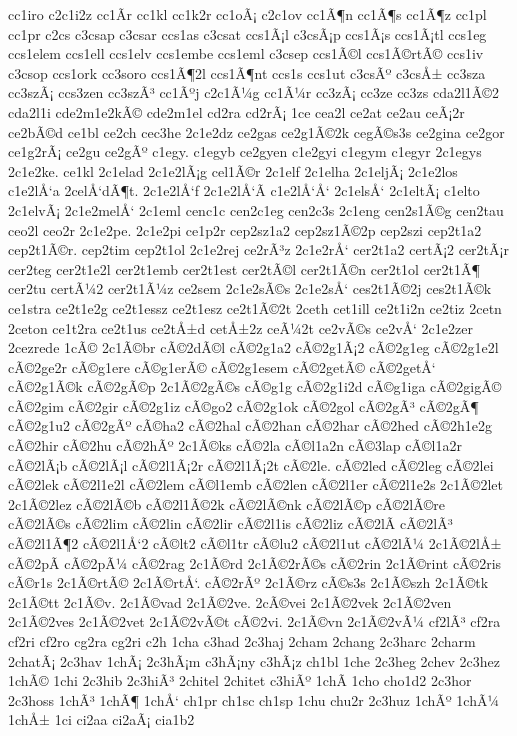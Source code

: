 {cc1iro
c2c1i2z
cc1Ã­r
cc1kl
cc1k2r
cc1oÃ¡
c2c1ov
cc1Ã¶n
cc1Ã¶s
cc1Ã¶z
cc1pl
cc1pr
c2cs
c3csap
c3csar
ccs1as
c3csat
ccs1Ã¡l
c3csÃ¡p
ccs1Ã¡s
ccs1Ã¡tl
ccs1eg
ccs1elem
ccs1ell
ccs1elv
ccs1embe
ccs1eml
c3csep
ccs1Ã©l
ccs1Ã©rtÃ©
ccs1iv
c3csop
ccs1ork
cc3soro
ccs1Ã¶2l
ccs1Ã¶nt
ccs1s
ccs1ut
c3csÃº
c3csÅ±
cc3sza
cc3szÃ¡
ccs3zen
cc3szÃ³
cc1Ãºj
c2c1Ã¼g
cc1Ã¼r
cc3zÃ¡
cc3ze
cc3zs
cda2l1Ã©2
cda2l1i
cde2m1e2kÃ©
cde2m1el
cd2ra
cd2rÃ¡
1ce
cea2l
ce2at
ce2au
ceÃ¡2r
ce2bÃ©d
ce1bl
ce2ch
cec3he
2c1e2dz
ce2gas
ce2g1Ã©2k
cegÃ©s3s
ce2gina
ce2gor
ce1g2rÃ¡
ce2gu
ce2gÃº
c1egy.
c1egyb
ce2gyen
c1e2gyi
c1egym
c1egyr
2c1egys
2c1e2ke.
ce1kl
2c1elad
2c1e2lÃ¡g
cel1Ã©r
2c1elf
2c1elha
2c1eljÃ¡
2c1e2los
c1e2lÅ‘a
2celÅ‘dÃ¶t.
2c1e2lÅ‘f
2c1e2lÅ‘Ã­
c1e2lÅ‘Å‘
2c1elsÅ‘
2c1eltÃ¡
c1elto
2c1elvÃ¡
2c1e2melÅ‘
2c1eml
cenc1c
cen2c1eg
cen2c3s
2c1eng
cen2s1Ã©g
cen2tau
ceo2l
ceo2r
2c1e2pe.
2c1e2pi
ce1p2r
cep2sz1a2
cep2sz1Ã©2p
cep2szi
cep2t1a2
cep2t1Ã©r.
cep2tim
cep2t1ol
2c1e2rej
ce2rÃ³z
2c1e2rÅ‘
cer2t1a2
certÃ¡2
cer2tÃ¡r
cer2teg
cer2t1e2l
cer2t1emb
cer2t1est
cer2tÃ©l
cer2t1Ã©n
cer2t1ol
cer2t1Ã¶
cer2tu
certÃ¼2
cer2t1Ã¼z
ce2sem
2c1e2sÃ©s
2c1e2sÅ‘
ces2t1Ã©2j
ces2t1Ã©k
ce1stra
ce2t1e2g
ce2t1essz
ce2t1esz
ce2t1Ã©2t
2ceth
cet1ill
ce2t1i2n
ce2tiz
2cetn
2ceton
ce1t2ra
ce2t1us
ce2tÅ±d
cetÅ±2z
ceÃ¼2t
ce2vÃ©s
ce2vÅ‘
2c1e2zer
2cezrede
1cÃ©
2c1Ã©br
cÃ©2dÃ©l
cÃ©2g1a2
cÃ©2g1Ã¡2
cÃ©2g1eg
cÃ©2g1e2l
cÃ©2ge2r
cÃ©g1ere
cÃ©g1erÃ©
cÃ©2g1esem
cÃ©2getÃ©
cÃ©2getÅ‘
cÃ©2g1Ã©k
cÃ©2gÃ©p
2c1Ã©2gÃ©s
cÃ©g1g
cÃ©2g1i2d
cÃ©g1iga
cÃ©2gigÃ©
cÃ©2gim
cÃ©2gir
cÃ©2g1iz
cÃ©go2
cÃ©2g1ok
cÃ©2gol
cÃ©2gÃ³
cÃ©2gÃ¶
cÃ©2g1u2
cÃ©2gÃº
cÃ©ha2
cÃ©2hal
cÃ©2han
cÃ©2har
cÃ©2hed
cÃ©2h1e2g
cÃ©2hir
cÃ©2hu
cÃ©2hÃº
2c1Ã©ks
cÃ©2la
cÃ©l1a2n
cÃ©3lap
cÃ©l1a2r
cÃ©2lÃ¡b
cÃ©2lÃ¡l
cÃ©2l1Ã¡2r
cÃ©2l1Ã¡2t
cÃ©2le.
cÃ©2led
cÃ©2leg
cÃ©2lei
cÃ©2lek
cÃ©2l1e2l
cÃ©2lem
cÃ©l1emb
cÃ©2len
cÃ©2l1er
cÃ©2l1e2s
2c1Ã©2let
2c1Ã©2lez
cÃ©2lÃ©b
cÃ©2l1Ã©2k
cÃ©2lÃ©nk
cÃ©2lÃ©p
cÃ©2lÃ©re
cÃ©2lÃ©s
cÃ©2lim
cÃ©2lin
cÃ©2lir
cÃ©2l1is
cÃ©2liz
cÃ©2lÃ­
cÃ©2lÃ³
cÃ©2l1Ã¶2
cÃ©2l1Å‘2
cÃ©lt2
cÃ©l1tr
cÃ©lu2
cÃ©2l1ut
cÃ©2lÃ¼
2c1Ã©2lÅ±
cÃ©2pÃ­
cÃ©2pÃ¼
cÃ©2rag
2c1Ã©rd
2c1Ã©2rÃ©s
cÃ©2rin
2c1Ã©rint
cÃ©2ris
cÃ©r1s
2c1Ã©rtÃ©
2c1Ã©rtÅ‘.
cÃ©2rÃº
2c1Ã©rz
cÃ©s3s
2c1Ã©szh
2c1Ã©tk
2c1Ã©tt
2c1Ã©v.
2c1Ã©vad
2c1Ã©2ve.
2cÃ©vei
2c1Ã©2vek
2c1Ã©2ven
2c1Ã©2ves
2c1Ã©2vet
2c1Ã©2vÃ©t
cÃ©2vi.
2c1Ã©vn
2c1Ã©2vÃ¼
cf2lÃ³
cf2ra
cf2ri
cf2ro
cg2ra
cg2ri
c2h
1cha
c3had
2c3haj
2cham
2chang
2c3harc
2charm
2chatÃ¡
2c3hav
1chÃ¡
2c3hÃ¡m
c3hÃ¡ny
c3hÃ¡z
ch1bl
1che
2c3heg
2chev
2c3hez
1chÃ©
1chi
2c3hib
2c3hiÃ³
2chitel
2chitet
c3hiÃº
1chÃ­
1cho
cho1d2
2c3hor
2c3hoss
1chÃ³
1chÃ¶
1chÅ‘
ch1pr
ch1sc
ch1sp
1chu
chu2r
2c3huz
1chÃº
1chÃ¼
1chÅ±
1ci
ci2aa
ci2aÃ¡
cia1b2
}
